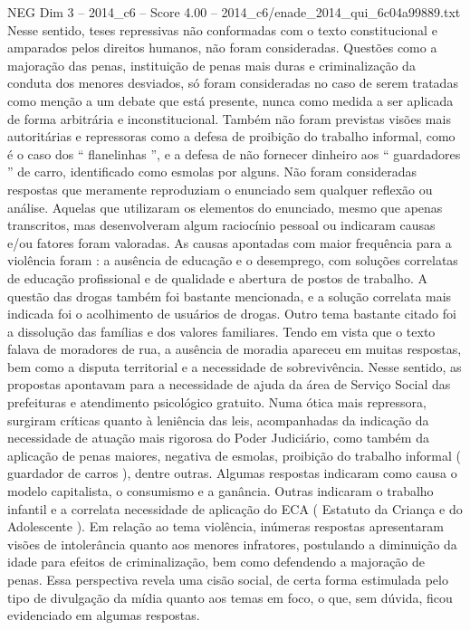 \begin{textsample}{NEG Dim 3 – 2014\_c6 – Score 4.00 – 2014\_c6/enade\_2014\_qui\_6c04a99889.txt}
Nesse sentido, teses repressivas não conformadas com o texto constitucional e amparados pelos direitos humanos, não foram consideradas.
Questões como a majoração das penas, instituição de penas mais duras e criminalização da conduta dos menores desviados, só foram consideradas no caso de serem tratadas como menção a um debate que está presente, nunca como medida a ser aplicada de forma arbitrária e inconstitucional.
Também não foram previstas visões mais autoritárias e repressoras como a defesa de proibição do trabalho informal, como é o caso dos “ flanelinhas ”, e a defesa de não fornecer dinheiro aos “ guardadores ” de carro, identificado como esmolas por alguns.
Não foram consideradas respostas que meramente reproduziam o enunciado sem qualquer reflexão ou análise.
Aquelas que utilizaram os elementos do enunciado, mesmo que apenas transcritos, mas desenvolveram algum raciocínio pessoal ou indicaram causas e/ou fatores foram valoradas.
As causas apontadas com maior frequência para a violência foram : a ausência de educação e o desemprego, com soluções correlatas de educação profissional e de qualidade e abertura de postos de trabalho.
A questão das drogas também foi bastante mencionada, e a solução correlata mais indicada foi o acolhimento de usuários de drogas.
Outro tema bastante citado foi a dissolução das famílias e dos valores familiares.
Tendo em vista que o texto falava de moradores de rua, a ausência de moradia apareceu em muitas respostas, bem como a disputa territorial e a necessidade de sobrevivência.
Nesse sentido, as propostas apontavam para a necessidade de ajuda da área de Serviço Social das prefeituras e atendimento psicológico gratuito.
Numa ótica mais repressora, surgiram críticas quanto à leniência das leis, acompanhadas da indicação da necessidade de atuação mais rigorosa do Poder Judiciário, como também da aplicação de penas maiores, negativa de esmolas, proibição do trabalho informal ( guardador de carros ), dentre outras.
Algumas respostas indicaram como causa o modelo capitalista, o consumismo e a ganância.
Outras indicaram o trabalho infantil e a correlata necessidade de aplicação do ECA ( Estatuto da Criança e do Adolescente ).
Em relação ao tema violência, inúmeras respostas apresentaram visões de intolerância quanto aos menores infratores, postulando a diminuição da idade para efeitos de criminalização, bem como defendendo a majoração de penas.
Essa perspectiva revela uma cisão social, de certa forma estimulada pelo tipo de divulgação da mídia quanto aos temas em foco, o que, sem dúvida, ficou evidenciado em algumas respostas.

\end{textsample}
